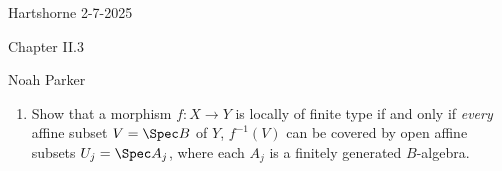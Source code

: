 \documentclass[12pt]{amsart}
\begin{document}
{Hartshorne} \hfill {2-7-2025}

\bigskip\bigskip

\begin{center}

{\sc Chapter II.3}

\end{center}

\begin{center}

  {Noah Parker} 
    
\end{center}

\bigskip

\begin{enumerate}
	\item[3.1.] {
      Show that a morphism $f:X\to Y$ is locally of finite type if and only if \emph{every} affine subset $V=\Spec B$ of $Y$, $f^{-1}(V)$ can be covered by open affine subsets $U_j=\Spec A_j$, where each $A_j$ is a finitely generated $B$-algebra.
    }
\end{enumerate}
\end{document}

